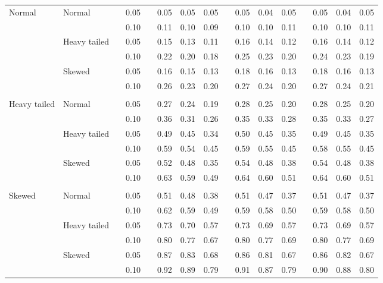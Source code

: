 \begin{table}[ht]
\begin{scriptsize}
\begin{tabular}{ll p{.1cm} c p{.1cm} rrr p{.1cm} rrr p{.1cm} rrr}
\rowcolor{gray!20}Normal       & Normal       && 0.05 &&   0.05 & 0.05 & 0.05 && 0.05 & 0.04 & 0.05 && 0.05 & 0.04 & 0.05 \\ 
\rowcolor{gray!20}             &              && 0.10 &&   0.11 & 0.10 & 0.09 && 0.10 & 0.10 & 0.11 && 0.10 & 0.10 & 0.11 \\ 
\rowcolor{gray!20}             & Heavy tailed && 0.05 &&   0.15 & 0.13 & 0.11 && 0.16 & 0.14 & 0.12 && 0.16 & 0.14 & 0.12 \\ 
\rowcolor{gray!20}             &              && 0.10 &&   0.22 & 0.20 & 0.18 && 0.25 & 0.23 & 0.20 && 0.24 & 0.23 & 0.19 \\ 
\rowcolor{gray!20}             & Skewed       && 0.05 &&   0.16 & 0.15 & 0.13 && 0.18 & 0.16 & 0.13 && 0.18 & 0.16 & 0.13 \\ 
\rowcolor{gray!20}             &              && 0.10 &&   0.26 & 0.23 & 0.20 && 0.27 & 0.24 & 0.20 && 0.27 & 0.24 & 0.21 \\ 
             &&&&&&&&&&&&&&&\\
Heavy tailed & Normal       && 0.05 &&   0.27 & 0.24 & 0.19 && 0.28 & 0.25 & 0.20 && 0.28 & 0.25 & 0.20 \\ 
             &              && 0.10 &&   0.36 & 0.31 & 0.26 && 0.35 & 0.33 & 0.28 && 0.35 & 0.33 & 0.27 \\ 
             & Heavy tailed && 0.05 &&   0.49 & 0.45 & 0.34 && 0.50 & 0.45 & 0.35 && 0.49 & 0.45 & 0.35 \\ 
             &              && 0.10 &&   0.59 & 0.54 & 0.45 && 0.59 & 0.55 & 0.45 && 0.58 & 0.55 & 0.45 \\ 
             & Skewed       && 0.05 &&   0.52 & 0.48 & 0.35 && 0.54 & 0.48 & 0.38 && 0.54 & 0.48 & 0.38 \\ 
             &              && 0.10 &&   0.63 & 0.59 & 0.49 && 0.64 & 0.60 & 0.51 && 0.64 & 0.60 & 0.51 \\
             &&&&&&&&&&&&&&&\\ 
Skewed       & Normal       && 0.05 &&   0.51 & 0.48 & 0.38 && 0.51 & 0.47 & 0.37 && 0.51 & 0.47 & 0.37 \\ 
             &              && 0.10 &&   0.62 & 0.59 & 0.49 && 0.59 & 0.58 & 0.50 && 0.59 & 0.58 & 0.50 \\ 
             & Heavy tailed && 0.05 &&   0.73 & 0.70 & 0.57 && 0.73 & 0.69 & 0.57 && 0.73 & 0.69 & 0.57 \\ 
             &              && 0.10 &&   0.80 & 0.77 & 0.67 && 0.80 & 0.77 & 0.69 && 0.80 & 0.77 & 0.69 \\ 
             & Skewed       && 0.05 &&   0.87 & 0.83 & 0.68 && 0.86 & 0.81 & 0.67 && 0.86 & 0.82 & 0.67 \\ 
             &              && 0.10 &&   0.92 & 0.89 & 0.79 && 0.91 & 0.87 & 0.79 && 0.90 & 0.88 & 0.80 \\ 


\end{tabular}
\end{scriptsize}
\end{table}
